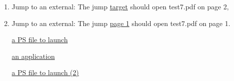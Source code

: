 \documentclass[]{article}
\begin{document}
\begin{enumerate}

\item Jump to an external: The jump
\href{file:test7#TestTarget}{target} should open test7.pdf on
page 2, 
\item  Jump to an external: The jump
\href{file:test7#page.1}{page 1} should open test7.pdf on
page 1.


\href{run:picture.eps}{a PS file to launch}

\href{run:fontman.exe}{an application}

\href{run:e:\string\\mdraw\string\\mdraw.exe#picture.eps}{a PS file to launch (2)}
\end{enumerate}
\printindex
\clearpage
\end{document}
